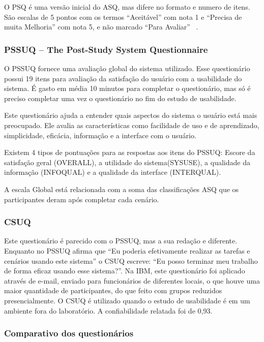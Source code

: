 O PSQ  é uma versão inicial do ASQ, mas difere no formato e numero de itens.  São escalas de 5 pontos com os termos “Aceitável” com nota 1 e “Precisa de muita Melhoria” com nota 5, e não marcado “Para Avaliar” ~\cite{lewis1995ibm}.

\subsubsection{PSSUQ – The Post-Study System Questionnaire}

	O PSSUQ fornece uma avaliação global do sistema utilizado. Esse questionário possui 19 itens para avaliação da satisfação do usuário com a usabilidade do sistema. É gasto em média 10 minutos para completar o questionário, mas só é preciso completar uma vez o questionário no fim do estudo de usabilidade. ~\cite{lewis1995ibm} 

	Este questionário ajuda a entender quais aspectos do sistema o usuário está mais preocupado. Ele avalia as características como facilidade de uso e de aprendizado, simplicidade, eficácia, informação e a interface com o usuário.

	Existem 4 tipos de pontuações para as respostas aos itens do PSSUQ: Escore da satisfação geral (OVERALL), a utilidade do sistema(SYSUSE), a qualidade da  informação (INFOQUAL) e a qualidade da interface (INTERQUAL). 

A escala Global está relacionada com a soma das classificações ASQ que os participantes deram após completar cada cenário. 

\subsubsection{CSUQ}

	Este questionário é parecido com o PSSUQ, mas a sua redação e diferente. Enquanto no PSSUQ afirma que “Eu poderia efetivamente realizar as tarefas e cenários usando este sistema” o CSUQ escreve: “Eu posso terminar meu trabalho de forma eficaz usando esse sistema?”. Na IBM, este questionário foi aplicado através de e-mail, enviado para funcionários de diferentes locais, o que houve uma maior quantidade de participantes, do que feito com grupos reduzidos presencialmente.
	O CSUQ é utilizado quando o estudo de usabilidade é em um ambiente fora do laboratório. A confiabilidade relatada foi de 0,93.

\subsubsection{Comparativo dos questionários}

